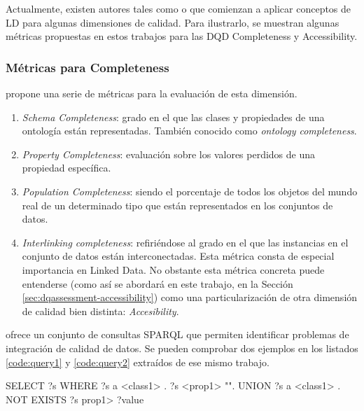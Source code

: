 Actualmente, existen autores tales como \cite{zaveri_quality_2013} o
\cite{Furber:2011:TVD:1966901.1966903} que comienzan a aplicar conceptos de
\acs{LD} para algunas dimensiones de calidad. Para ilustrarlo, se muestran
algunas métricas propuestas en estos trabajos para las \acs{DQD} Completeness y
Accessibility. 

\subsubsection{Métricas para Completeness}
\label{sec:dqassessment-completeness}
\label{metricasdq}

\cite{zaveri_quality_2013} propone una serie de métricas para la evaluación de
esta dimensión. 

\label{schemacompleteness}
\label{interlinking}
\begin{enumerate}
\item \textit{Schema Completeness}: grado en el que las clases y propiedades de
  una ontología están representadas. También conocido como \textit{ontology
    completeness}.

\item \textit{Property Completeness}: evaluación sobre los valores perdidos de
  una propiedad específica.

\item \textit{Population Completeness}: siendo el porcentaje de todos los
  objetos del mundo real de un determinado tipo que están representados en los
  conjuntos de datos. 

\item \textit{Interlinking completeness}: refiriéndose al grado en el que las
  instancias en el conjunto de datos están interconectadas. Esta métrica consta
  de especial importancia en Linked Data. No obstante esta métrica concreta
  puede entenderse (como así se abordará en este trabajo, en la Sección \ref{sec:dqassessment-accessibility}) como una
  particularización de otra dimensión de calidad bien distinta:
  \textit{Accesibility}. 

\end{enumerate}

\cite{conf/ekaw/FurberH10} ofrece un conjunto de consultas
\acs{SPARQL} que permiten identificar problemas de integración de calidad de
datos. Se pueden comprobar dos ejemplos en los listados
\ref{code:query1} y \ref{code:query2} extraídos de ese mismo trabajo. 



\begin{listing}[
  float=ht,
  language = SQL,
  numbers=left,
  numberstyle=\tiny,
  stepnumber=1,
  numbersep=5pt,
  frame=single,
  caption  = {Consulta \acs{SPARQL} para identificación de literales perdidos (I)},
  label    = code:query1]
SELECT ?s 
WHERE { {
  ?s a <class1> .
  ?s <prop1> "". }
UNION{
  ?s a <class1> .
  NOT EXISTS {
  ?s prop1> ?value}}}

\end{listing}



